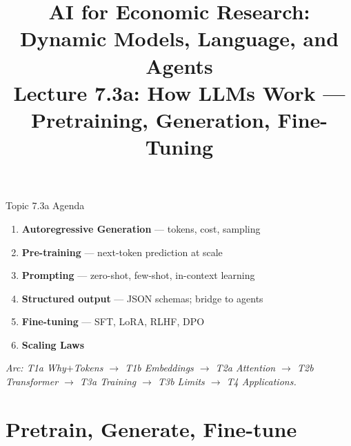 


\usetikzlibrary{arrows.meta, positioning, shapes.geometric, fit, backgrounds}

\graphicspath{{./pic/}{../../MiniCourse_8hr/Slides/Module3_LLM_Text/pic/}{../}}

\title[AI for Econ Research]{AI for Economic Research: Dynamic Models, Language, and Agents\\
Lecture 7.3a: How LLMs Work --- Pretraining, Generation, Fine-Tuning}



\makebeamertitle

\begin{frame}{Topic 7.3a Agenda}
\begin{enumerate}
  \item \textbf{Autoregressive Generation} --- tokens, cost, sampling
  \medskip
  \item \textbf{Pre-training} --- next-token prediction at scale
  \medskip
  \item \textbf{Prompting} --- zero-shot, few-shot, in-context learning
  \medskip
  \item \textbf{Structured output} --- JSON schemas; bridge to agents
  \medskip
  \item \textbf{Fine-tuning} --- SFT, LoRA, RLHF, DPO
  \medskip
  \item \textbf{Scaling Laws}
\end{enumerate}

\bigskip
\footnotesize\textit{Arc: T1a Why$+$Tokens $\to$ T1b Embeddings $\to$ T2a Attention $\to$ T2b Transformer $\to$ T3a Training $\to$ T3b Limits $\to$ T4 Applications.}
\end{frame}

\section{Pretrain, Generate, Fine-tune}

